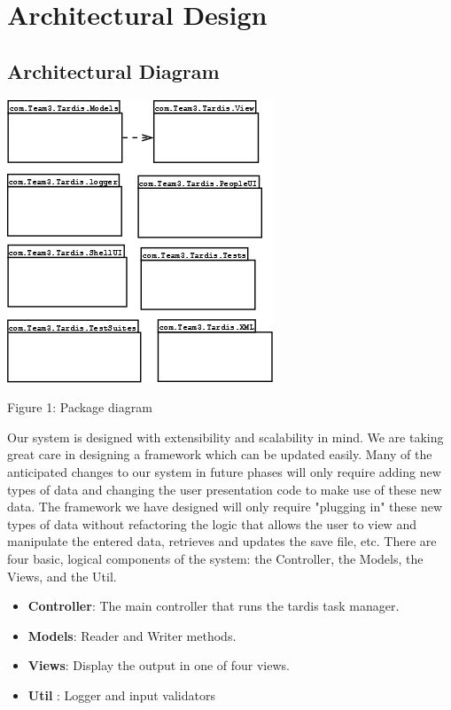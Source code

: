 
\section{Architectural Design} \label{sec:arch}



\subsection{Architectural Diagram}
\vspace*{0.5in}
\includegraphics{diagrams/package_diagram}
\centerline {Figure 1: Package diagram}
\vspace*{0.2in}

Our system is designed with extensibility and scalability in mind.  We are taking great care in designing a framework which can be updated easily.  Many of the anticipated changes to our system in future phases will only require adding new types of data and changing the user presentation code to make use of these new data.  The framework we have designed will only require "plugging in" these new types of data without refactoring the logic that allows the user to view and manipulate the entered data, retrieves and updates the save file, etc.  There are four basic, logical components of the system: the Controller, the Models, the Views, and the Util.

\begin{itemize}

\item {\bf Controller}: The main controller that runs the tardis task manager.

\item {\bf Models}: Reader and Writer methods.

\item {\bf Views}: Display the output in one of four views.

\item {\bf Util} : Logger and input validators

\end{itemize}



